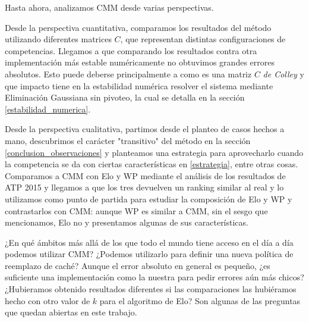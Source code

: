 Hasta ahora, analizamos CMM desde varias perspectivas.

Desde la perspectiva cuantitativa, comparamos los resultados del método utilizando diferentes matrices $C$, que representan distintas configuraciones de competencias. Llegamos a que comparando los resultados contra otra implementación más estable numéricamente no obtuvimos grandes errores absolutos. Esto puede deberse principalmente a como es una matriz $C$ \textit{de Colley} y que impacto tiene en la estabilidad numérica resolver el sistema mediante Eliminación Gaussiana sin pivoteo, la cual se detalla en la sección \ref{estabilidad_numerica}.

Desde la perspectiva cualitativa, partimos desde el planteo de casos hechos a mano, descubrimos el carácter "transitivo" del método en la sección \ref{conclusion_observaciones} y planteamos una estrategia para aprovecharlo cuando la competencia se da con ciertas características en \ref{estrategia}, entre otras cosas. Comparamos a CMM con Elo y WP mediante el análisis de los resultados de ATP 2015 y llegamos a que los tres devuelven un ranking similar al real y lo utilizamos como punto de partida para estudiar la composición de Elo y WP y contrastarlos con CMM: aunque WP es similar a CMM, sin el sesgo que mencionamos, Elo no y presentamos algunas de sus características.

¿En qué ámbitos más allá de los que todo el mundo tiene acceso en el día a día podemos utilizar CMM? ¿Podemos utilizarlo para definir una nueva política de reemplazo de caché? Aunque el error absoluto en general es pequeño, ¿es suficiente una implementación como la nuestra para pedir errores aún más chicos? ¿Hubieramos obtenido resultados diferentes si las comparaciones las hubiéramos hecho con otro valor de $k$ para el algoritmo de Elo? Son algunas de las preguntas que quedan abiertas en este trabajo.